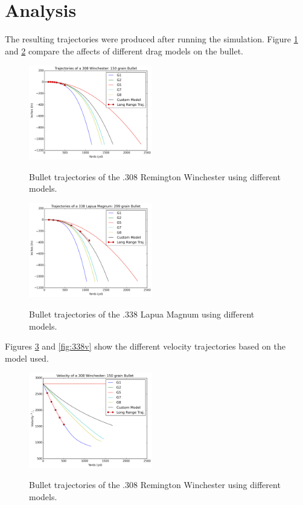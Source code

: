 \documentclass{article}%
\begin{document}
    \section{Analysis}
    The resulting trajectories were produced after running the simulation. Figure \ref{fig:308x} and \ref{fig:388x} compare the affects of different drag models on the bullet. 

    \begin{figure}[!h]  
        \centering
        \includegraphics[width=0.48\textwidth]{../img/308-Winchester_dist_comp.png}
        \label{fig:308x}         
        \caption{Bullet trajectories of the .308 Remington Winchester using different models. }
    \end{figure}
    
    \begin{figure}[!h]  
        \centering
        \includegraphics[width=0.48\textwidth]{../img/338-Lapua-Magnum_dist_comp.png}
        \label{fig:388x}         
        \caption{Bullet trajectories of the .338 Lapua Magnum using different models. }
    \end{figure}

    Figures \ref{fig:308v} and \ref{fig:338v} show the different velocity trajectories based on the model used. 


    \begin{figure}[!h]  
        \centering
        \includegraphics[width=0.48\textwidth]{../img/308-Winchester_vel_comp.png}
        \label{fig:308v}         
        \caption{Bullet trajectories of the .308 Remington Winchester using different models. }
    \end{figure}
    
\end{document}
